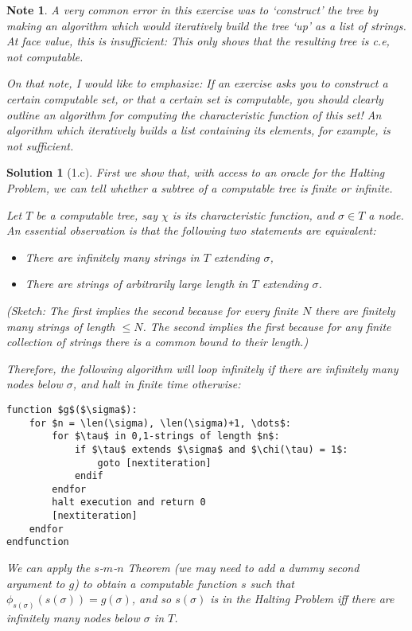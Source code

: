 \documentclass{article}
\theoremstyle{nonumberplain}
\newtheorem{sol}{Solution}
\newtheorem{note}{Note}
\DeclareMathOperator{\len}{length}
\begin{document}
\begin{note}
A very common error in this exercise was to `construct' the tree by making an algorithm which would iteratively build the tree `up' as a list of strings. At face value, this is insufficient: This only shows that the resulting tree is c.e, not computable.

On that note, I would like to emphasize: \emph{If an exercise asks you to construct a certain computable set, or that a certain set is computable, you should clearly outline an algorithm for computing the characteristic function of this set!} An algorithm which iteratively builds a list containing its elements, for example, \emph{is not sufficient}.
\end{note}

\begin{sol}[1.c]
First we show that, with access to an oracle for the Halting Problem, we can tell whether a subtree of a computable tree is finite or infinite.

Let $T$ be a computable tree, say $\chi$ is its characteristic function, and $\sigma \in T$ a node. An essential observation is that the following two statements are equivalent:
\begin{itemize}
\item There are infinitely many strings in $T$ extending $\sigma$,
\item There are strings of arbitrarily large length in $T$ extending $\sigma$.
\end{itemize}

(Sketch: The first implies the second because for every finite $N$ there are finitely many strings of length $\leq N$. The second implies the first because for any finite collection of strings there is a common bound to their length.)

Therefore, the following algorithm will loop infinitely if there are infinitely many nodes below $\sigma$, and halt in finite time otherwise:
\begin{lstlisting}
function $g$($\sigma$):
    for $n = \len(\sigma), \len(\sigma)+1, \dots$:
        for $\tau$ in 0,1-strings of length $n$:
            if $\tau$ extends $\sigma$ and $\chi(\tau) = 1$:
                goto [nextiteration]
            endif
        endfor
        halt execution and return 0
        [nextiteration]
    endfor
endfunction
\end{lstlisting}

We can apply the $s$-$m$-$n$ Theorem (we may need to add a dummy second argument to $g$) to obtain a computable function $s$ such that $\phi_{s(\sigma)}(s(\sigma)) = g(\sigma)$, and so $s(\sigma)$ is in the Halting Problem iff there are infinitely many nodes below $\sigma$ in $T$.


\end{sol}
\end{document}
